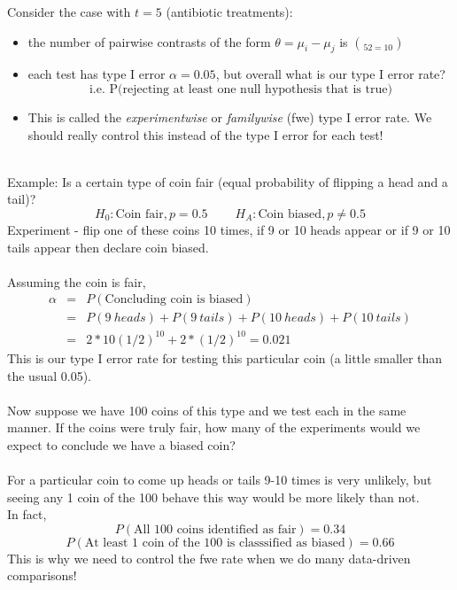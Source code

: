Consider the case with $t=5$ (antibiotic treatments): 
\begin{itemize}
\item the number of pairwise contrasts of the form $\theta=\mu_i-\mu_j$ is $\choose{5}{2}=10$
\item each test has type I error $\alpha=0.05$, but overall what is our type I error rate?
$$\mbox{i.e. P(rejecting at least one null hypothesis that is true)}$$
\item This is called the \textit{experimentwise} or \textit{familywise} (fwe) type I error rate.  We should really control this instead of the type I error for each test!\\~\\
\end{itemize}

Example:  Is a certain type of coin fair (equal probability of flipping a head and a tail)?
$$H_0: \mbox{Coin fair}, p=0.5~~~~~~~~~~H_A:\mbox{Coin biased}, p\neq 0.5$$
Experiment - flip one of these coins 10 times, if 9 or 10  heads appear or if 9 or 10 tails appear then declare coin biased.\\~\\
Assuming the coin is fair, 
\begin{eqnarray*}
\alpha & = & P(\mbox{Concluding coin is biased})\\
 & = & P(9~heads)+P(9~tails)+P(10~heads)+P(10~tails)\\
& = & 2*10(1/2)^{10}+2*(1/2)^{10}=0.021
\end{eqnarray*}
This is our type I error rate for testing this particular coin (a little smaller than the usual 0.05).\\~\\
Now suppose we have 100 coins of this type and we test each in the same manner.  If the coins were truly fair, how many of the experiments would we expect to conclude we have a biased coin?\\~\\
For a particular coin to come up heads or tails 9-10 times is very unlikely, but seeing any 1 coin of the 100 behave this way would be more likely than not.\\
In fact, 
$$P(\mbox{All 100 coins identified as fair})=0.34$$
$$P(\mbox{At least 1 coin of the 100 is classsified as biased})=0.66$$
This is why we need to control the fwe rate when we do many data-driven comparisons!\\~\\
~\\~\\~\\~\\~\\~\\~\\~\\~\\~\\

